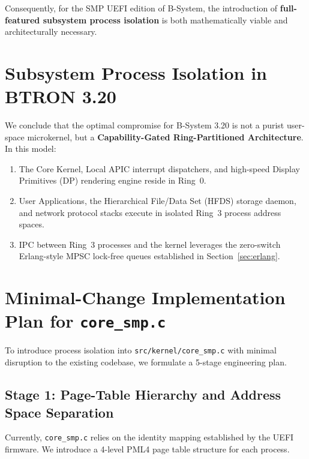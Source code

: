 \documentclass[10pt,journal,compsoc,twocolumn]{article}
\begin{document}
Consequently, for the SMP UEFI edition of B-System, the introduction of \textbf{full-featured subsystem process isolation} is both mathematically viable and architecturally necessary.

\section{Subsystem Process Isolation in BTRON 3.20}
\label{sec:isolation_plan}

We conclude that the optimal compromise for B-System 3.20 is not a purist user-space microkernel, but a \textbf{Capability-Gated Ring-Partitioned Architecture}. In this model:
\begin{enumerate}[leftmargin=*]
    \item The Core Kernel, Local APIC interrupt dispatchers, and high-speed Display Primitives (DP) rendering engine reside in Ring~0.
    \item User Applications, the Hierarchical File/Data Set (HFDS) storage daemon, and network protocol stacks execute in isolated Ring~3 process address spaces.
    \item IPC between Ring~3 processes and the kernel leverages the zero-switch Erlang-style MPSC lock-free queues established in Section~\ref{sec:erlang}.
\end{enumerate}

\section{Minimal-Change Implementation Plan for \texttt{core\_smp.c}}
\label{sec:core_smp_plan}

To introduce process isolation into \texttt{src/kernel/core\_smp.c} with minimal disruption to the existing codebase, we formulate a 5-stage engineering plan.

\subsection{Stage 1: Page-Table Hierarchy and Address Space Separation}
Currently, \texttt{core\_smp.c} relies on the identity mapping established by the UEFI firmware. We introduce a 4-level PML4 page table structure for each process.
\end{document}
